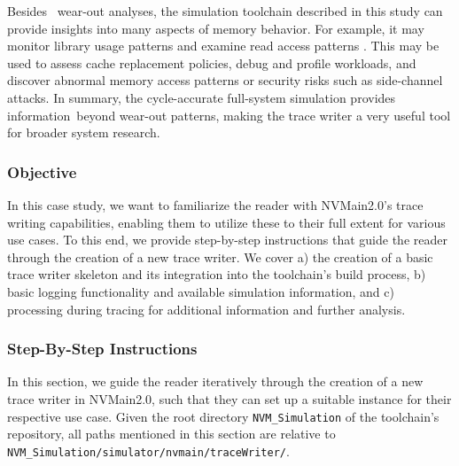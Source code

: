 Besides  wear-out analyses, the simulation toolchain described in this study can provide insights into many aspects of memory behavior. For example, it may monitor library usage patterns \cite{hakert:2020:split} and examine read access patterns \cite{hakert:2022}.  This may be used to assess cache replacement policies, debug and profile workloads, and discover abnormal memory access patterns or security risks such as side-channel attacks.
In summary, the cycle-accurate full-system simulation provides information beyond wear-out patterns, making the trace writer a very useful tool for broader system research.


\subsubsection{Objective}
\label{tudo:objective}
In this case study, we want to familiarize the reader with NVMain2.0's trace writing capabilities, enabling them to utilize these to their full extent for various use cases. To this end, we provide step-by-step instructions that guide the reader through the creation of a new trace writer. We cover a) the creation of a basic trace writer skeleton and its integration into the toolchain's build process, b) basic logging functionality and available simulation information, and c) processing during tracing for additional information and further analysis.











\subsubsection{Step-By-Step Instructions}
\label{subsubsec:tud-instructions}
In this section, we guide the reader iteratively through the creation of a new trace writer in NVMain2.0, such that they can set up a suitable instance for their respective use case. Given the root directory \texttt{NVM\_Simulation} of the toolchain's repository, all paths mentioned in this section are relative to \texttt{NVM\_Simulation/simulator/nvmain/traceWriter/}.


